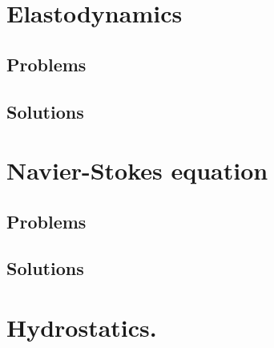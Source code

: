    \chapter{Elastodynamics}
      
      
      
      
      \section{Problems}
         
      \section{Solutions}
         \shipoutAnswer

   \chapter{Navier-Stokes equation}
      
      
      
      
      
      

      \section{Problems}
         
         
         
         
         
         
         
         
      \section{Solutions}
         \shipoutAnswer

   \chapter{Hydrostatics.}
      
